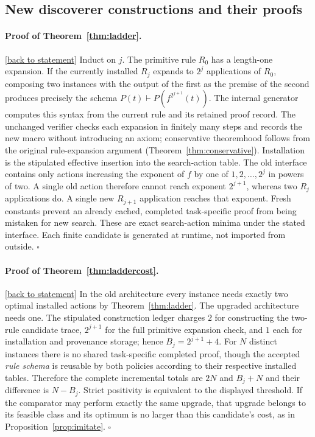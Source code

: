 \documentclass[11pt,letterpaper]{article}
\theoremstyle{definition}
\theoremstyle{remark}
\newcommand{\backlink}[1]{\hyperlink{claim:#1}{\footnotesize[back to statement]}}
\begin{document}
\subsection*{New discoverer constructions and their proofs}
\paragraph{Proof of Theorem~\ref{thm:ladder}.}\hypertarget{proof:ladder}{}\backlink{ladder}
Induct on $j$. The primitive rule $R_0$ has a length-one expansion. If the currently installed $R_j$ expands to $2^j$ applications of $R_0$, composing two instances with the output of the first as the premise of the second produces precisely the schema $P(t)\vdash P(f^{2^{j+1}}(t))$. The internal generator computes this syntax from the current rule and its retained proof record. The unchanged verifier checks each expansion in finitely many steps and records the new macro without introducing an axiom; conservative theoremhood follows from the original rule-expansion argument (Theorem~\ref{thm:conservative}). Installation is the stipulated effective insertion into the search-action table. The old interface contains only actions increasing the exponent of $f$ by one of $1,2,\ldots,2^j$ in powers of two. A single old action therefore cannot reach exponent $2^{j+1}$, whereas two $R_j$ applications do. A single new $R_{j+1}$ application reaches that exponent. Fresh constants prevent an already cached, completed task-specific proof from being mistaken for new search. These are exact search-action minima under the stated interface. Each finite candidate is generated at runtime, not imported from outside. $\square$

\paragraph{Proof of Theorem~\ref{thm:laddercost}.}\hypertarget{proof:laddercost}{}\backlink{laddercost}
In the old architecture every instance needs exactly two optimal installed actions by Theorem~\ref{thm:ladder}. The upgraded architecture needs one. The stipulated construction ledger charges $2$ for constructing the two-rule candidate trace, $2^{j+1}$ for the full primitive expansion check, and $1$ each for installation and provenance storage; hence $B_j=2^{j+1}+4$. For $N$ distinct instances there is no shared task-specific completed proof, though the accepted \emph{rule schema} is reusable by both policies according to their respective installed tables. Therefore the complete incremental totals are $2N$ and $B_j+N$ and their difference is $N-B_j$. Strict positivity is equivalent to the displayed threshold. If the comparator may perform exactly the same upgrade, that upgrade belongs to its feasible class and its optimum is no larger than this candidate's cost, as in Proposition~\ref{prop:imitate}. $\square$
\end{document}
